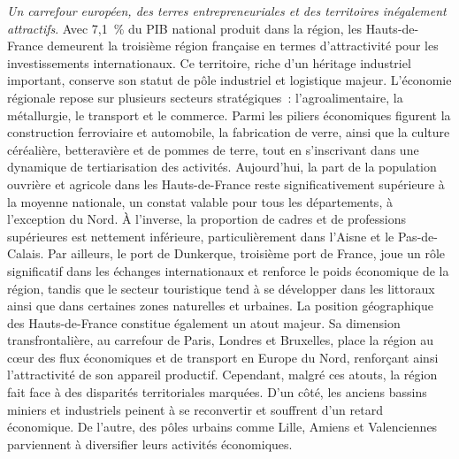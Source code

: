 \begin{refsegment}
\textsl{Un carrefour européen, des terres entrepreneuriales et des territoires inégalement attractifs}. Avec 7,1~\% du \acrshort{PIB} national produit dans la région, les Hauts-de-France demeurent la troisième région française en termes d’attractivité pour les investissements internationaux. Ce territoire, riche d’un héritage industriel important, conserve son statut de pôle industriel et logistique majeur. L’économie régionale repose sur plusieurs secteurs stratégiques~: l’agroalimentaire, la métallurgie, le transport et le commerce. Parmi les piliers économiques figurent la construction ferroviaire et automobile, la fabrication de verre, ainsi que la culture céréalière, betteravière et de pommes de terre, tout en s’inscrivant dans une dynamique de tertiarisation des activités. Aujourd’hui, la part de la population ouvrière et agricole dans les Hauts-de-France reste significativement supérieure à la moyenne nationale, un constat valable pour tous les départements, à l’exception du Nord. À l’inverse, la proportion de cadres et de professions supérieures est nettement inférieure, particulièrement dans l’Aisne et le Pas-de-Calais. Par ailleurs, le port de Dunkerque, troisième port de France, joue un rôle significatif dans les échanges internationaux et renforce le poids économique de la région, tandis que le secteur touristique tend à se développer dans les littoraux ainsi que dans certaines zones naturelles et urbaines. La position géographique des Hauts-de-France constitue également un atout majeur. Sa dimension transfrontalière, au carrefour de Paris, Londres et Bruxelles, place la région au cœur des flux économiques et de transport en Europe du Nord, renforçant ainsi l’attractivité de son appareil productif. Cependant, malgré ces atouts, la région fait face à des disparités territoriales marquées. D’un côté, les anciens bassins miniers et industriels peinent à se reconvertir et souffrent d’un retard économique. De l’autre, des pôles urbains comme Lille, Amiens et Valenciennes parviennent à diversifier leurs activités économiques.%


\end{refsegment}
